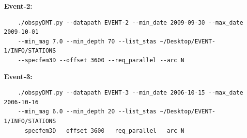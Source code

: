 \documentclass{article}
\begin{document}
\textbf{Event-2:}

\begin{verbatim}
    ./obspyDMT.py --datapath EVENT-2 --min_date 2009-09-30 --max_date 2009-10-01
    --min_mag 7.0 --min_depth 70 --list_stas ~/Desktop/EVENT-1/INFO/STATIONS
    --specfem3D --offset 3600 --req_parallel --arc N
\end{verbatim}

\textbf{Event-3:}

\begin{verbatim}
    ./obspyDMT.py --datapath EVENT-3 --min_date 2006-10-15 --max_date 2006-10-16
    --min_mag 6.0 --min_depth 20 --list_stas ~/Desktop/EVENT-1/INFO/STATIONS
    --specfem3D --offset 3600 --req_parallel --arc N
\end{verbatim}


\newpage
\end{document}
